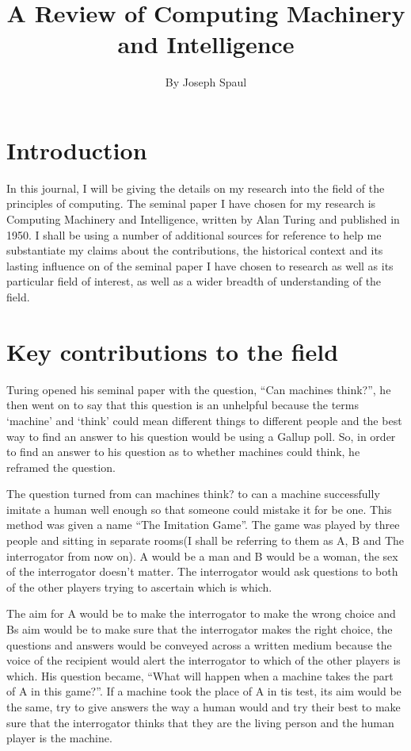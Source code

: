 \documentclass{article}
\title{A Review of Computing Machinery and Intelligence}
\author{By Joseph Spaul}
\begin{document}
\maketitle

\section{Introduction}

In this journal, I will be giving the details on my research into the field of the principles of computing. 
The seminal paper I have chosen for my research is Computing Machinery and Intelligence, written by Alan Turing 
and published in 1950. I shall be using a number of additional sources for reference to help me substantiate my 
claims about the contributions, the historical context and its lasting influence on of the seminal paper I have 
chosen to research as well as its particular field of interest, as well as a wider breadth of understanding of 
the field.

\section{Key contributions to the field}

Turing opened his seminal paper with the question, “Can machines think?”, he then went on to say that this 
question is an unhelpful because the terms ‘machine’ and ‘think’ could mean different things to different 
people and the best way to find an answer to his question would be using a Gallup poll. So, in order to find 
an answer to his question as to whether machines could think, he reframed the question. 

The question turned from can machines think? to can a machine successfully imitate a human well enough so that 
someone could mistake it for be one. This method was given a name “The Imitation Game”. The game was played by 
three people and sitting in separate rooms(I shall be referring to them as A, B and The interrogator from now 
on). A would be a man and B would be a woman, the sex of the interrogator doesn’t matter. The interrogator would 
ask questions to both of the other players trying to ascertain which is which. 

The aim for A would be to make the interrogator to make the wrong choice and Bs aim would be to make sure that the  
interrogator makes the right choice, the questions and answers would be conveyed across a written medium because 
the voice of the recipient would alert the interrogator to which of the other players is which. His question 
became, “What will happen when a machine takes the part of A in this game?”. If a machine took the place of A in 
tis test, its aim would be the same, try to give answers the way a human would and try their best to make sure that 
the interrogator thinks that they are the living person and the human player is the machine. 
\end{document}
